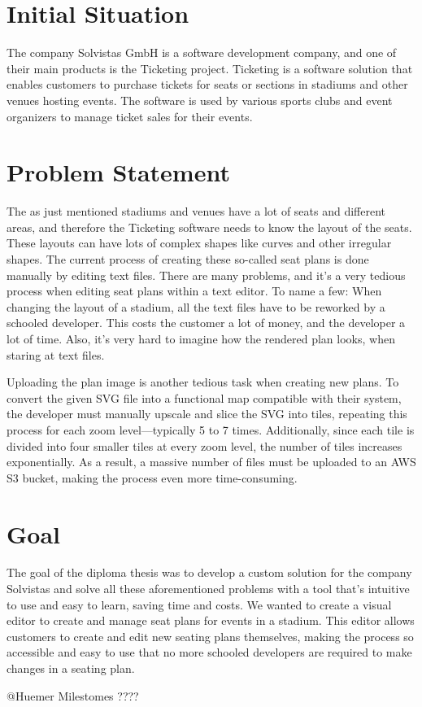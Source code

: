 \section{Initial Situation}
The company Solvistas GmbH is a software development company, and one of their main products is the Ticketing project. Ticketing is a software solution that enables customers to purchase tickets for seats or sections in stadiums and other venues hosting events. The software is used by various sports clubs and event organizers to manage ticket sales for their events.


\section{Problem Statement}
The as just mentioned stadiums and venues have a lot of seats and different areas, and therefore the Ticketing software needs to know the layout of the seats. These layouts can have lots of complex shapes like curves and other irregular shapes. The current process of creating these so-called seat plans is done manually by editing text files. There are many problems, and it's a very tedious process when editing seat plans within a text editor. To name a few: When changing the layout of a stadium, all the text files have to be reworked by a schooled developer. This costs the customer a lot of money, and the developer a lot of time. Also, it's very hard to imagine how the rendered plan looks, when staring at text files.

Uploading the plan image is another tedious task when creating new plans. To convert the given SVG file into a functional map compatible with their system, the developer must manually upscale and slice the SVG into tiles, repeating this process for each zoom level—typically 5 to 7 times. Additionally, since each tile is divided into four smaller tiles at every zoom level, the number of tiles increases exponentially. As a result, a massive number of files must be uploaded to an AWS S3 bucket, making the process even more time-consuming.

\section{Goal}
The goal of the diploma thesis was to develop a custom solution for the company Solvistas and solve all these aforementioned problems with a tool that's intuitive to use and easy to learn, saving time and costs. We wanted to create a visual editor to create and manage seat plans for events in a stadium. This editor allows customers to create and edit new seating plans themselves, making the process so accessible and easy to use that no more schooled developers are required to make changes in a seating plan.

@Huemer Milestomes ????